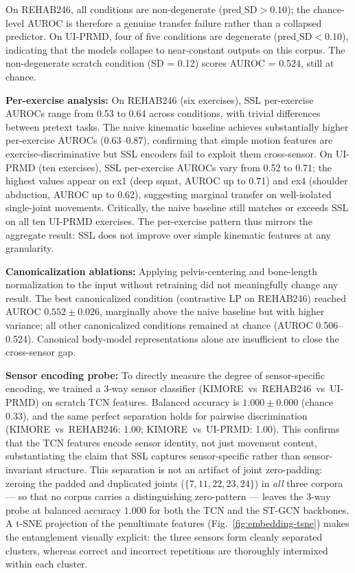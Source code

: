 \documentclass[10pt,journal]{IEEEtran}
\begin{document}
On REHAB246, all conditions are non-degenerate ($\text{pred\_SD} > 0.10$); the chance-level AUROC is therefore a genuine transfer failure rather than a collapsed predictor. On UI-PRMD, four of five conditions are degenerate ($\text{pred\_SD} < 0.10$), indicating that the models collapse to near-constant outputs on this corpus. The non-degenerate scratch condition (SD = 0.12) scores AUROC = 0.524, still at chance.

\textbf{Per-exercise analysis:} On REHAB246 (six exercises), SSL per-exercise AUROCs range from 0.53 to 0.64 across conditions, with trivial differences between pretext tasks. The naive kinematic baseline achieves substantially higher per-exercise AUROCs (0.63--0.87), confirming that simple motion features are exercise-discriminative but SSL encoders fail to exploit them cross-sensor. On UI-PRMD (ten exercises), SSL per-exercise AUROCs vary from 0.52 to 0.71; the highest values appear on ex1 (deep squat, AUROC up to 0.71) and ex4 (shoulder abduction, AUROC up to 0.62), suggesting marginal transfer on well-isolated single-joint movements. Critically, the naive baseline still matches or exceeds SSL on all ten UI-PRMD exercises. The per-exercise pattern thus mirrors the aggregate result: SSL does not improve over simple kinematic features at any granularity.

\textbf{Canonicalization ablations:} Applying pelvis-centering and bone-length normalization to the input without retraining did not meaningfully change any result. The best canonicalized condition (contrastive LP on REHAB246) reached AUROC $0.552 \pm 0.026$, marginally above the naive baseline but with higher variance; all other canonicalized conditions remained at chance (AUROC 0.506--0.524). Canonical body-model representations alone are insufficient to close the cross-sensor gap.

\textbf{Sensor encoding probe:} To directly measure the degree of sensor-specific encoding, we trained a 3-way sensor classifier (KIMORE~vs~REHAB246~vs~UI-PRMD) on scratch TCN features. Balanced accuracy is $1.000 \pm 0.000$ (chance 0.33), and the same perfect separation holds for pairwise discrimination (KIMORE~vs~REHAB246: 1.00; KIMORE~vs~UI-PRMD: 1.00). This confirms that the TCN features encode sensor identity, not just movement content, substantiating the claim that SSL captures sensor-specific rather than sensor-invariant structure. This separation is not an artifact of joint zero-padding: zeroing the padded and duplicated joints ($\{7,11,22,23,24\}$) in \emph{all} three corpora --- so that no corpus carries a distinguishing zero-pattern --- leaves the 3-way probe at balanced accuracy $1.000$ for both the TCN and the ST-GCN backbones. A t-SNE projection of the penultimate features (Fig.~\ref{fig:embedding-tsne}) makes the entanglement visually explicit: the three sensors form cleanly separated clusters, whereas correct and incorrect repetitions are thoroughly intermixed within each cluster.
\end{document}
